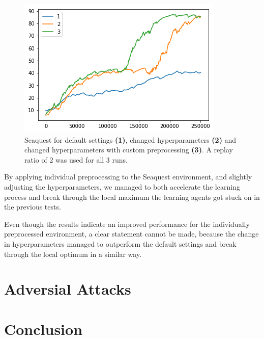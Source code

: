 \begin{figure}[h]
\includegraphics[scale=0.8]{bilder/seaquestprepro}
\caption{Seaquest for default settings \textbf{(1)}, changed hyperparameters \textbf{(2)} and changed hyperparameters with custom preprocessing \textbf{(3)}. A replay ratio of 2 was used for all 3 runs.}
\end{figure}

By applying individual preprocessing to the Seaquest environment, and slightly adjusting the hyperparameters, we managed to both accelerate the learning process and break through the local maximum the learning agents got stuck on in the previous tests.

Even though the results indicate an improved performance for the individually preprocessed environment, a clear statement cannot be made, because the change in hyperparameters managed to outperform the default settings and break through the local optimum in a similar way.

\section{Adversial Attacks}

\section{Conclusion}